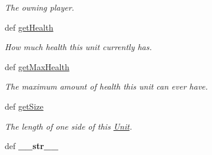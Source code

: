 \begin{DoxyCompactItemize}
\begin{DoxyCompactList}\small\item\em The owning player. \item\end{DoxyCompactList}\item 
\hypertarget{classGameObject_1_1Wall_abacbb0b4d5729c993040b0f6b8ae3069}{
def \hyperlink{classGameObject_1_1Wall_abacbb0b4d5729c993040b0f6b8ae3069}{getHealth}}
\label{classGameObject_1_1Wall_abacbb0b4d5729c993040b0f6b8ae3069}

\begin{DoxyCompactList}\small\item\em How much health this unit currently has. \item\end{DoxyCompactList}\item 
\hypertarget{classGameObject_1_1Wall_a7fd11d3b45f2a4c4ce9c4ee1cdb3a508}{
def \hyperlink{classGameObject_1_1Wall_a7fd11d3b45f2a4c4ce9c4ee1cdb3a508}{getMaxHealth}}
\label{classGameObject_1_1Wall_a7fd11d3b45f2a4c4ce9c4ee1cdb3a508}

\begin{DoxyCompactList}\small\item\em The maximum amount of health this unit can ever have. \item\end{DoxyCompactList}\item 
\hypertarget{classGameObject_1_1Wall_a1340a600c968946cdc328fa7296f88fd}{
def \hyperlink{classGameObject_1_1Wall_a1340a600c968946cdc328fa7296f88fd}{getSize}}
\label{classGameObject_1_1Wall_a1340a600c968946cdc328fa7296f88fd}

\begin{DoxyCompactList}\small\item\em The length of one side of this \hyperlink{classGameObject_1_1Unit}{Unit}. \item\end{DoxyCompactList}\item 
\hypertarget{classGameObject_1_1Wall_ad10be1aaaadeffa34b4903a2b4d7d1de}{
def {\bfseries \_\-\_\-str\_\-\_\-}}
\label{classGameObject_1_1Wall_ad10be1aaaadeffa34b4903a2b4d7d1de}

\end{DoxyCompactItemize}
